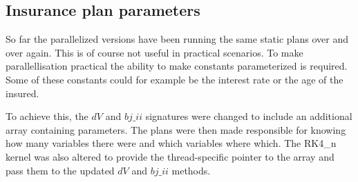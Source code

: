 \begin{table}[h!]
\centering
{}
\caption{F\# Alea.cuBase calculations per ms with double precision\label{table:cubaseManualdoubletime}}
\end{table}



\subsection{Insurance plan parameters}
So far the parallelized versions have been running the same static plans over and over again.
This is of course not useful in practical scenarios.
To make parallellisation practical the ability to make constants parameterized is required.
Some of these constants could for example be the interest rate or the age of the insured.

To achieve this, the $dV$ and $bj\_ii$ signatures were changed to include an additional array containing parameters.
The plans were then made responsible for knowing how many variables there were and which variables where which. 
The RK4\_n kernel was also altered to provide the thread-specific pointer to the array and pass them to the updated $dV$ and $bj\_ii$ methods.


